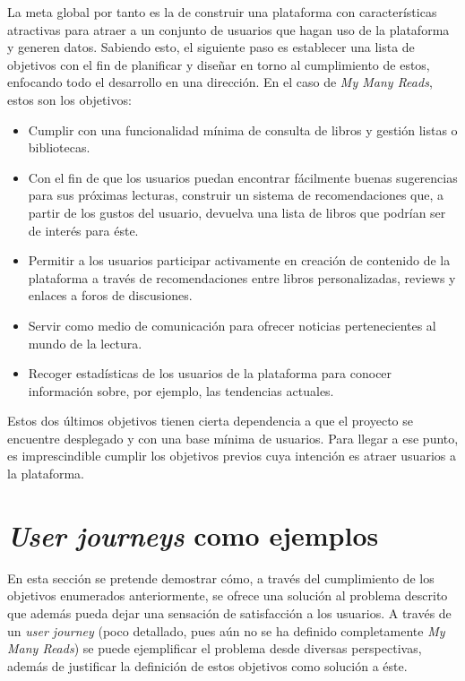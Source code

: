 La meta global por tanto es la de construir una plataforma con características atractivas para atraer a un conjunto de usuarios que hagan uso de la plataforma y generen datos. Sabiendo esto, el siguiente paso es establecer una lista de objetivos con el fin de planificar y diseñar en torno al cumplimiento de estos, enfocando todo el desarrollo en una dirección. En el caso de \textit{My Many Reads}, estos son los objetivos:

\begin{itemize}
    \item Cumplir con una funcionalidad mínima de consulta de libros y gestión listas o bibliotecas.
    \item Con el fin de que los usuarios puedan encontrar fácilmente buenas sugerencias para sus próximas lecturas, construir un sistema de recomendaciones que, a partir de los gustos del usuario, devuelva una lista de libros que podrían ser de interés para éste.
    \item Permitir a los usuarios participar activamente en creación de contenido de la plataforma a través de recomendaciones entre libros personalizadas, reviews y enlaces a foros de discusiones.
    \item Servir como medio de comunicación para ofrecer noticias pertenecientes al mundo de la lectura.
    \item Recoger estadísticas de los usuarios de la plataforma para conocer información sobre, por ejemplo, las tendencias actuales.
\end{itemize}

Estos dos últimos objetivos tienen cierta dependencia a que el proyecto se encuentre desplegado y con una base mínima de usuarios. Para llegar a ese punto, es imprescindible cumplir los objetivos previos cuya intención es atraer usuarios a la plataforma.

\section{\textit{User journeys} como ejemplos}
\label{user journeys}

En esta sección se pretende demostrar cómo, a través del cumplimiento de los objetivos enumerados anteriormente, se ofrece una solución al problema descrito que además pueda dejar una sensación de satisfacción a los usuarios. A través de un \textit{user journey} (poco detallado, pues aún no se ha definido completamente \textit{My Many Reads}) se puede ejemplificar el problema desde diversas perspectivas, además de justificar la definición de estos objetivos como solución a éste.

